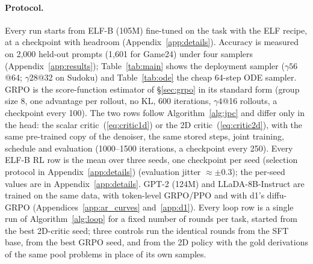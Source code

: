 \paragraph{Protocol.}
Every run starts from ELF-B (105M) fine-tuned on the task with the ELF recipe, at a checkpoint with headroom (Appendix~\ref{app:details}). Accuracy is measured on 2{,}000 held-out prompts (1{,}601 for Game24) under four samplers (Appendix~\ref{app:results}); Table~\ref{tab:main} shows the deployment sampler ($\gamma56$@64; $\gamma28$@32 on Sudoku) and Table~\ref{tab:ode} the cheap 64-step ODE sampler. GRPO is the score-function estimator of \S\ref{sec:grpo} in its standard form (group size 8, one advantage per rollout, no KL, 600 iterations, $\gamma4$@16 rollouts, a checkpoint every 100). The two \jpc{} rows follow Algorithm~\ref{alg:jpc} and differ only in the head: the scalar critic~(\ref{eq:critic1d}) or the 2D critic~(\ref{eq:critic2d}), with the same pre-trained copy of the denoiser, the same stored steps, joint training, schedule and evaluation (1000--1500 iterations, a checkpoint every 250). Every ELF-B RL row is the mean over three seeds, one checkpoint per seed (selection protocol in Appendix~\ref{app:details}) (evaluation jitter $\approx\pm0.3$); the per-seed values are in Appendix~\ref{app:details}. GPT-2 (124M) and LLaDA-8B-Instruct are trained on the same data, with token-level GRPO/PPO and with d1's diffu-GRPO (Appendices~\ref{app:ar_curves} and~\ref{app:d1}). Every loop row is a single run of Algorithm~\ref{alg:loop} for a fixed number of rounds per task, started from the best 2D-critic seed; three controls run the identical rounds from the SFT base, from the best GRPO seed, and from the 2D policy with the gold derivations of the same pool problems in place of its own samples.

